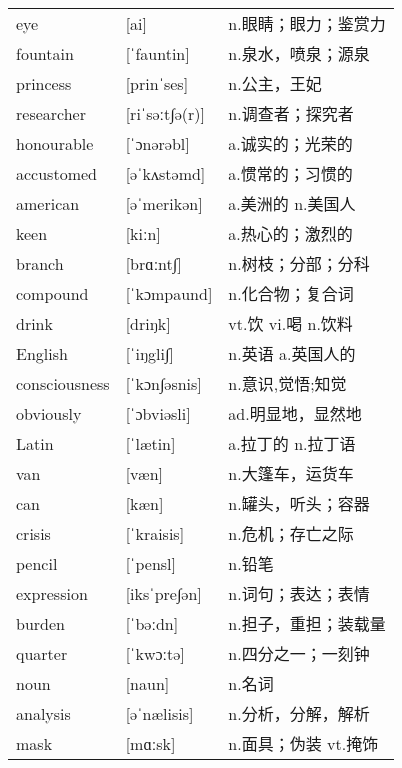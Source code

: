 \documentclass[a4paper]{article}
\begin{document}
\section{}
\begin{tabular}{l l l}

eye & [ai] & n.眼睛；眼力；鉴赏力 \\
fountain & [ˈfauntin] & n.泉水，喷泉；源泉 \\
princess & [prinˈses] & n.公主，王妃 \\
researcher & [riˈsəːt∫ə(r)] & n.调查者；探究者 \\
honourable & [ˈɔnərəbl] & a.诚实的；光荣的 \\
accustomed & [əˈkʌstəmd] & a.惯常的；习惯的 \\
american & [əˈmerikən] & a.美洲的 n.美国人 \\
keen & [kiːn] & a.热心的；激烈的 \\
branch & [brɑːnt∫] & n.树枝；分部；分科 \\
compound & [ˈkɔmpaund] & n.化合物；复合词 \\
drink & [driŋk] & vt.饮 vi.喝 n.饮料 \\
English & [ˈiŋgli∫] & n.英语 a.英国人的 \\
consciousness & [ˈkɔn∫əsnis] & n.意识,觉悟;知觉 \\
obviously & [ˈɔbviəsli] & ad.明显地，显然地 \\
Latin & [ˈlætin] & a.拉丁的 n.拉丁语 \\
van & [væn] & n.大篷车，运货车 \\
can & [kæn] & n.罐头，听头；容器 \\
crisis & [ˈkraisis] & n.危机；存亡之际 \\
pencil & [ˈpensl] & n.铅笔 \\
expression & [iksˈpre∫ən] & n.词句；表达；表情 \\
burden & [ˈbəːdn] & n.担子，重担；装载量 \\
quarter & [ˈkwɔːtə] & n.四分之一；一刻钟 \\
noun & [naun] & n.名词 \\
analysis & [əˈnælisis] & n.分析，分解，解析 \\
mask & [mɑːsk] & n.面具；伪装 vt.掩饰 \\

\end{tabular}
\end{document}
